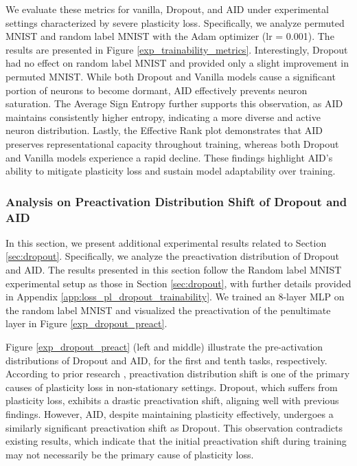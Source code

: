\newpage

We evaluate these metrics for vanilla, Dropout, and AID under experimental settings characterized by severe plasticity loss. Specifically, we analyze permuted MNIST and random label MNIST with the Adam optimizer (lr = 0.001). The results are presented in Figure \ref{exp_trainability_metrics}. Interestingly, Dropout had no effect on random label MNIST and provided only a slight improvement in permuted MNIST. While both Dropout and Vanilla models cause a significant portion of neurons to become dormant, AID effectively prevents neuron saturation. The Average Sign Entropy further supports this observation, as AID maintains consistently higher entropy, indicating a more diverse and active neuron distribution. Lastly, the Effective Rank plot demonstrates that AID preserves representational capacity throughout training, whereas both Dropout and Vanilla models experience a rapid decline. These findings highlight AID’s ability to mitigate plasticity loss and sustain model adaptability over training.

\newpage
\subsubsection{Analysis on Preactivation Distribution Shift of Dropout and AID}
\label{app:omitted_results_preactivation}



In this section, we present additional experimental results related to Section \ref{sec:dropout}. Specifically, we analyze the preactivation distribution of Dropout and AID. The results presented in this section follow the Random label MNIST experimental setup as those in Section \ref{sec:dropout}, with further details provided in Appendix \ref{app:loss_pl_dropout_trainability}. We trained an 8-layer MLP on the random label MNIST and visualized the preactivation of the penultimate layer in Figure \ref{exp_dropout_preact}. 

Figure \ref{exp_dropout_preact} (left and middle) illustrate the pre-activation distributions of Dropout and AID, for the first and tenth tasks, respectively. According to prior research \cite{lyle2024disentangling}, preactivation distribution shift is one of the primary causes of plasticity loss in non-stationary settings. Dropout, which suffers from plasticity loss, exhibits a drastic preactivation shift, aligning well with previous findings. However, AID, despite maintaining plasticity effectively, undergoes a similarly significant preactivation shift as Dropout. This observation contradicts existing results, which indicate that the initial preactivation shift during training may not necessarily be the primary cause of plasticity loss.

